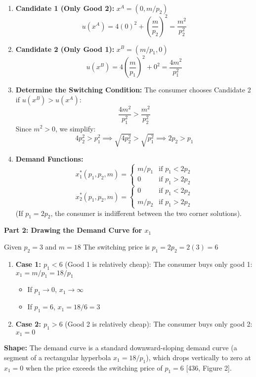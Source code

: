\documentclass{article}
\begin{document}
\begin{enumerate}
\item \textbf{Candidate 1 (Only Good 2):} $x^A = (0, m/p_2)$
\[ u(x^A) = 4(0)^2 + \left(\frac{m}{p_2}\right)^2 = \frac{m^2}{p_2^2} \]
\item \textbf{Candidate 2 (Only Good 1):} $x^B = (m/p_1, 0)$
\[ u(x^B) = 4\left(\frac{m}{p_1}\right)^2 + 0^2 = \frac{4m^2}{p_1^2} \]
\item \textbf{Determine the Switching Condition:} The consumer chooses Candidate 2 if $u(x^B) > u(x^A)$:
\[ \frac{4m^2}{p_1^2} > \frac{m^2}{p_2^2} \]
Since $m^2 > 0$, we simplify:
\[ 4p_2^2 > p_1^2 \implies \sqrt{4p_2^2} > \sqrt{p_1^2} \implies 2p_2 > p_1 \]
\item \textbf{Demand Functions:}
\[ x_1^*(p_1, p_2, m) = \begin{cases} m/p_1 & \text{if } p_1 < 2p_2 \\ 0 & \text{if } p_1 > 2p_2 \end{cases} \]
\[ x_2^*(p_1, p_2, m) = \begin{cases} 0 & \text{if } p_1 < 2p_2 \\ m/p_2 & \text{if } p_1 > 2p_2 \end{cases} \]
(If $p_1 = 2p_2$, the consumer is indifferent between the two corner solutions).
\end{enumerate}

\textbf{Part 2: Drawing the Demand Curve for $x_1$}

Given $p_2 = 3$ and $m = 18$ The switching price is $p_1 = 2p_2 = 2(3) = 6$

\begin{enumerate}
\item \textbf{Case 1: $p_1 < 6$} (Good 1 is relatively cheap): The consumer buys only good 1: $x_1 = m/p_1 = 18/p_1$
\begin{itemize}
\item If $p_1 \to 0$, $x_1 \to \infty$
\item If $p_1 = 6$, $x_1 = 18/6 = 3$
\end{itemize}
\item \textbf{Case 2: $p_1 > 6$} (Good 2 is relatively cheap): The consumer buys only good 2: $x_1 = 0$
\end{enumerate}

\textbf{Shape:} The demand curve is a standard downward-sloping demand curve (a segment of a rectangular hyperbola $x_1 = 18/p_1$), which drops vertically to zero at $x_1=0$ when the price exceeds the switching price of $p_1=6$ [436, Figure 2].
\end{document}
